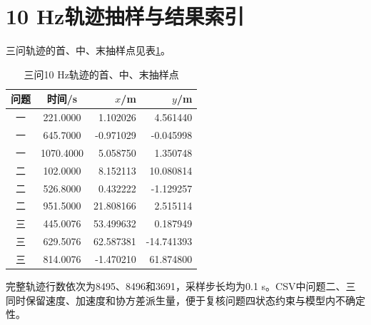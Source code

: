 \section{10 Hz轨迹抽样与结果索引}

三问轨迹的首、中、末抽样点见表\ref{tab:trajectory-samples}。

\begin{table}[htbp]
\centering
\caption{三问10 Hz轨迹的首、中、末抽样点}
\label{tab:trajectory-samples}
\begin{tabular}{ccrr}
\toprule
问题 & 时间/s & $x$/m & $y$/m\\
\midrule
一 & 221.0000 & 1.102026 & 4.561440\\
一 & 645.7000 & -0.971029 & -0.045998\\
一 & 1070.4000 & 5.058750 & 1.350748\\
二 & 102.0000 & 8.152113 & 10.080814\\
二 & 526.8000 & 0.432222 & -1.129257\\
二 & 951.5000 & 21.808166 & 2.515114\\
三 & 445.0076 & 53.499632 & 0.187949\\
三 & 629.5076 & 62.587381 & -14.741393\\
三 & 814.0076 & -1.470210 & 61.874800\\
\bottomrule
\end{tabular}
\end{table}

完整轨迹行数依次为8495、8496和3691，采样步长均为0.1 s。CSV中问题二、三同时保留速度、加速度和协方差派生量，便于复核问题四状态约束与模型内不确定性。
